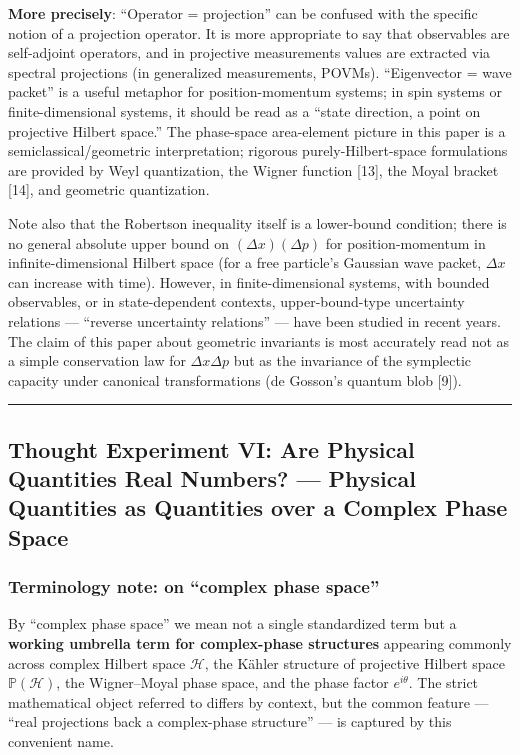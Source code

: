 \documentclass[
]{article}
\begin{document}
\textbf{More precisely}: ``Operator = projection'' can be confused with
the specific notion of a projection operator. It is more appropriate to
say that observables are self-adjoint operators, and in projective
measurements values are extracted via spectral projections (in
generalized measurements, POVMs). ``Eigenvector = wave packet'' is a
useful metaphor for position-momentum systems; in spin systems or
finite-dimensional systems, it should be read as a ``state direction, a
point on projective Hilbert space.'' The phase-space area-element
picture in this paper is a semiclassical/geometric interpretation;
rigorous purely-Hilbert-space formulations are provided by Weyl
quantization, the Wigner function {[}13{]}, the Moyal bracket {[}14{]},
and geometric quantization.

Note also that the Robertson inequality itself is a lower-bound
condition; there is no general absolute upper bound on
\((\Delta x)(\Delta p)\) for position-momentum in infinite-dimensional
Hilbert space (for a free particle's Gaussian wave packet, \(\Delta x\)
can increase with time). However, in finite-dimensional systems, with
bounded observables, or in state-dependent contexts, upper-bound-type
uncertainty relations --- ``reverse uncertainty relations'' --- have
been studied in recent years. The claim of this paper about geometric
invariants is most accurately read not as a simple conservation law for
\(\Delta x \Delta p\) but as the invariance of the symplectic capacity
under canonical transformations (de Gosson's quantum blob {[}9{]}).

\begin{center}\rule{0.5\linewidth}{0.5pt}\end{center}

\subsection{Thought Experiment VI: Are Physical Quantities Real Numbers?
--- Physical Quantities as Quantities over a Complex Phase
Space}\label{thought-experiment-vi-are-physical-quantities-real-numbers-physical-quantities-as-quantities-over-a-complex-phase-space}

\subsubsection{Terminology note: on ``complex phase
space''}\label{terminology-note-on-complex-phase-space}

By ``complex phase space'' we mean not a single standardized term but a
\textbf{working umbrella term for complex-phase structures} appearing
commonly across complex Hilbert space \(\mathcal{H}\), the Kähler
structure of projective Hilbert space \(\mathbb{P}(\mathcal{H})\), the
Wigner--Moyal phase space, and the phase factor \(e^{i\theta}\). The
strict mathematical object referred to differs by context, but the
common feature --- ``real projections back a complex-phase structure''
--- is captured by this convenient name.
\end{document}
